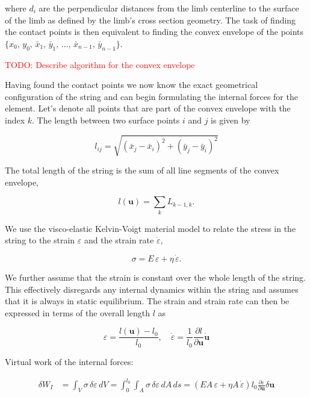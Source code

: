 where $d_{i}$ are the perpendicular distances from the limb centerline to the surface of the limb as defined by the limb's cross section geometry.
The task of finding the contact points is then equivalent to finding the convex envelope of the points $\{x_{0},\,y_{0},\,\bar{x}_{1},\,\bar{y}_{1},\,\ldots,\,\bar{x}_{n-1},\,\bar{y}_{n-1}\}$.

\textcolor{red}{TODO: Describe algorithm for the convex envelope}

Having found the contact points we now know the exact geometrical configuration of the string and can begin formulating the internal forces for the element.
Let's denote all points that are part of the convex envelope with the index $k$.
The length between two surface points $i$ and $j$ is given by

\begin{equation}
l_{ij} = \sqrt{(\bar{x}_j - \bar{x}_i)^2 + (\bar{y}_j - \bar{y}_i)^2}
\end{equation}

The total length of the string is the sum of all line segments of the convex envelope,

\begin{equation}
l(\boldsymbol{u}) = \sum_{k} L_{k-1,k}.
\end{equation}

We use the visco-elastic Kelvin-Voigt material model to relate the stress in the string to the strain $\varepsilon$ and the strain rate $\dot{\varepsilon}$,

\begin{equation}
\sigma = E\,\varepsilon + \eta\,\dot{\varepsilon}.
\end{equation}

We further assume that the strain is constant over the whole length of the string.
This effectively disregards any internal dynamics within the string and assumes that it is always in static equilibrium.
The strain and strain rate can then be expressed in terms of the overall length $l$ as

\begin{equation}
\varepsilon = \frac{l(\boldsymbol{u}) - l_{0}}{l_{0}}, \quad \dot{\varepsilon} = \frac{1}{l_{0}}\frac{\partial l}{\partial \boldsymbol{u}}\dot{\boldsymbol{u}}
\end{equation}

Virtual work of the internal forces:

\begin{align}
\delta W_{I} &= \int_{V} \sigma\,\delta\varepsilon\,dV = \int_{0}^{l_{0}}\int_{A} \sigma\,\delta\varepsilon\,dA\,ds = \left(EA\,\varepsilon + \eta A\,\dot{\varepsilon}\right)l_{0}\frac{\partial\varepsilon}{\partial\boldsymbol{u}}\delta\boldsymbol{u}
\end{align}

